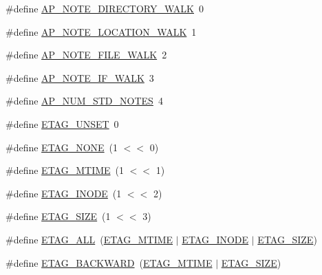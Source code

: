 \begin{DoxyCompactItemize}
\item 
\#define \hyperlink{group__APACHE__CORE__HTTPD_gac54fba6236ea7937a98edc994793cf78}{A\+P\+\_\+\+N\+O\+T\+E\+\_\+\+D\+I\+R\+E\+C\+T\+O\+R\+Y\+\_\+\+W\+A\+LK}~0
\item 
\#define \hyperlink{group__APACHE__CORE__HTTPD_gaee2be3d626d1198ed6ad06e65f3e1a67}{A\+P\+\_\+\+N\+O\+T\+E\+\_\+\+L\+O\+C\+A\+T\+I\+O\+N\+\_\+\+W\+A\+LK}~1
\item 
\#define \hyperlink{group__APACHE__CORE__HTTPD_ga7509e99c721b6a65694c2e331ce85a4f}{A\+P\+\_\+\+N\+O\+T\+E\+\_\+\+F\+I\+L\+E\+\_\+\+W\+A\+LK}~2
\item 
\#define \hyperlink{group__APACHE__CORE__HTTPD_ga098c946d4b19ef396a1d9e7c1cfa4474}{A\+P\+\_\+\+N\+O\+T\+E\+\_\+\+I\+F\+\_\+\+W\+A\+LK}~3
\item 
\#define \hyperlink{group__APACHE__CORE__HTTPD_ga613cf68722bf5a2c467135dbac8840b5}{A\+P\+\_\+\+N\+U\+M\+\_\+\+S\+T\+D\+\_\+\+N\+O\+T\+ES}~4
\item 
\#define \hyperlink{group__APACHE__CORE__HTTPD_gab2d67fe1c40ee439106b3b4b364e56bf}{E\+T\+A\+G\+\_\+\+U\+N\+S\+ET}~0
\item 
\#define \hyperlink{group__APACHE__CORE__HTTPD_ga5288af3e6a6a7a234625d88ec8d23f08}{E\+T\+A\+G\+\_\+\+N\+O\+NE}~(1 $<$$<$ 0)
\item 
\#define \hyperlink{group__APACHE__CORE__HTTPD_ga41215ae3dad3f1fa21496c094425a610}{E\+T\+A\+G\+\_\+\+M\+T\+I\+ME}~(1 $<$$<$ 1)
\item 
\#define \hyperlink{group__APACHE__CORE__HTTPD_ga0df92716554baef930c8713cff7c2711}{E\+T\+A\+G\+\_\+\+I\+N\+O\+DE}~(1 $<$$<$ 2)
\item 
\#define \hyperlink{group__APACHE__CORE__HTTPD_ga8720731a6862b82b5cd64ec88290e90b}{E\+T\+A\+G\+\_\+\+S\+I\+ZE}~(1 $<$$<$ 3)
\item 
\#define \hyperlink{group__APACHE__CORE__HTTPD_gafba44e435239e8fe4f2ec000611f9e32}{E\+T\+A\+G\+\_\+\+A\+LL}~(\hyperlink{group__APACHE__CORE__HTTPD_ga41215ae3dad3f1fa21496c094425a610}{E\+T\+A\+G\+\_\+\+M\+T\+I\+ME} $\vert$ \hyperlink{group__APACHE__CORE__HTTPD_ga0df92716554baef930c8713cff7c2711}{E\+T\+A\+G\+\_\+\+I\+N\+O\+DE} $\vert$ \hyperlink{group__APACHE__CORE__HTTPD_ga8720731a6862b82b5cd64ec88290e90b}{E\+T\+A\+G\+\_\+\+S\+I\+ZE})
\item 
\#define \hyperlink{group__APACHE__CORE__HTTPD_ga0318e03c433a59eca2826a7548a843d9}{E\+T\+A\+G\+\_\+\+B\+A\+C\+K\+W\+A\+RD}~(\hyperlink{group__APACHE__CORE__HTTPD_ga41215ae3dad3f1fa21496c094425a610}{E\+T\+A\+G\+\_\+\+M\+T\+I\+ME} $\vert$ \hyperlink{group__APACHE__CORE__HTTPD_ga8720731a6862b82b5cd64ec88290e90b}{E\+T\+A\+G\+\_\+\+S\+I\+ZE})

\end{DoxyCompactItemize}
